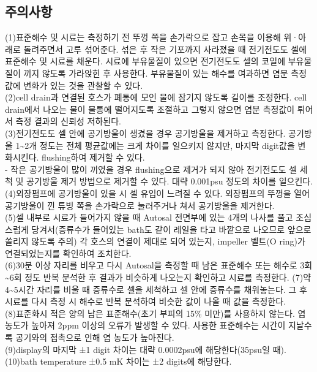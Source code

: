 \documentclass[
]{book}
\begin{document}
\hypertarget{uxc8fcuxc758uxc0acuxd56d}{%
\subsection{주의사항}\label{uxc8fcuxc758uxc0acuxd56d}}

(1)표준해수 및 시료는 측정하기 전 뚜껑 쪽을 손가락으로 잡고 손목을 이용해 위·아래로 돌려주면서 고루 섞어준다. 섞은 후 작은 기포까지 사라졌을 때 전기전도도 셀에 표준해수 및 시료를 채운다. 시료에 부유물질이 있으면 전기전도도 셀의 코일에 부유물질이 끼지 않도록 가라앉힌 후 사용한다. 부유물질이 있는 해수를 여과하면 염분 측정값에 변화가 있는 것을 관찰할 수 있다.\\
(2)cell drain과 연결된 호스가 폐통에 모인 물에 잠기지 않도록 길이를 조정한다. cell drain에서 나오는 물이 물통에 떨어지도록 조절하고 그렇지 않으면 염분 측정값이 튀어서 측정 결과의 신뢰성 저하된다.\\
(3)전기전도도 셀 안에 공기방울이 생겼을 경우 공기방울을 제거하고 측정한다. 공기방울 1\textasciitilde2개 정도는 전체 평균값에는 크게 차이를 일으키지 않지만, 마지막 digit값을 변화시킨다. flushing하여 제거할 수 있다.\\
- 작은 공기방울이 많이 끼였을 경우 flushing으로 제거가 되지 않아 전기전도도 셀 세척 및 공기방울 제거 방법으로 제거할 수 있다. 대략 0.001psu 정도의 차이를 일으킨다.\\
(4)외장펌프에 공기방울이 있을 시 셀 유입이 느려질 수 있다. 외장펌프의 뚜껑을 열어 공기방울이 낀 튜빙 쪽을 손가락으로 눌러주거나 쳐서 공기방울을 제거한다.\\
(5)셀 내부로 시료가 들어가지 않을 때 Autosal 전면부에 있는 4개의 나사를 풀고 조심스럽게 당겨서(증류수가 들어있는 bath도 같이 레일을 타고 바깥으로 나오므로 앞으로 쏠리지 않도록 주의) 각 호스의 연결이 제대로 되어 있는지, impeller 벨트(O ring)가 연결되었는지를 확인하여 조치한다.\\
(6)30분 이상 자리를 비우고 다시 Autosal을 측정할 때 남은 표준해수 또는 해수로 3회\textasciitilde6회 정도 반복 분석한 후 결과가 비슷하게 나오는지 확인하고 시료를 측정한다.
(7)약 4\textasciitilde5시간 자리를 비울 때 증류수로 셀을 세척하고 셀 안에 증류수를 채워놓는다. 그 후 시료를 다시 측정 시 해수로 반복 분석하여 비슷한 값이 나올 때 값을 측정한다.\\
(8)표준화시 적은 양의 남은 표준해수(초기 부피의 15\% 미만)를 사용하지 않는다. 염 농도가 높아져 2ppm 이상의 오류가 발생할 수 있다. 사용한 표준해수는 시간이 지날수록 공기와의 접촉으로 인해 염 농도가 높아진다.\\
(9)display의 마지막 ±1 digit 차이는 대략 0.0002psu에 해당한다(35psu일 때).\\
(10)bath temperature ±0.5 mK 차이는 ±2 digits에 해당한다.
\end{document}
